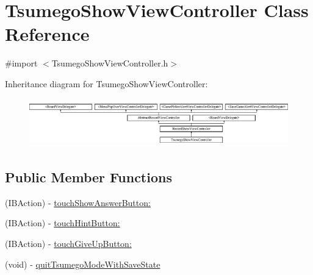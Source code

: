 \hypertarget{interface_tsumego_show_view_controller}{
\section{TsumegoShowViewController Class Reference}
\label{interface_tsumego_show_view_controller}
}


{\ttfamily \#import $<$TsumegoShowViewController.h$>$}

Inheritance diagram for TsumegoShowViewController:\begin{figure}[H]
\begin{center}
\leavevmode
\includegraphics[height=2.129278cm]{interface_tsumego_show_view_controller}
\end{center}
\end{figure}
\subsection*{Public Member Functions}
\begin{DoxyCompactItemize}
\item 
(IBAction) -\/ \hyperlink{interface_tsumego_show_view_controller_a7c668d88ecb8960ee6745bf8c9feb60e}{touchShowAnswerButton:}
\item 
(IBAction) -\/ \hyperlink{interface_tsumego_show_view_controller_ac089534bb2c7c5bafdd8ee65b0f73fe4}{touchHintButton:}
\item 
(IBAction) -\/ \hyperlink{interface_tsumego_show_view_controller_adc9b53bd0ee2ebb1cf8ff5a7ac04d77c}{touchGiveUpButton:}
\item 
(void) -\/ \hyperlink{interface_tsumego_show_view_controller_ad39e05bdd259c1341f8b9f83c8655e4c}{quitTsumegoModeWithSaveState}
\end{DoxyCompactItemize}

